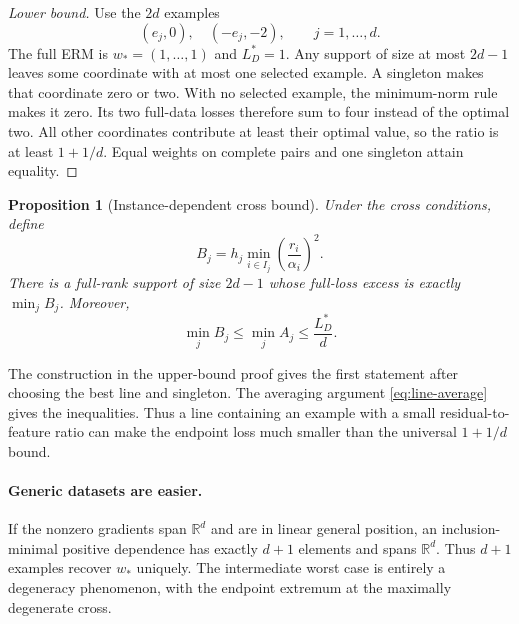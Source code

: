 \documentclass[twoside]{article}
\newtheorem{proposition}[theorem]{Proposition}
\newcommand{\R}{\mathbb R}
\begin{document}
\begin{proof}[Lower bound]
Use the $2d$ examples
\begin{equation}
 (e_j,0),\quad(-e_j,-2),\qquad j=1,\ldots,d.
 \label{eq:cross-lower}
\end{equation}
The full ERM is $w_*=(1,\ldots,1)$ and $L_D^*=1$. Any support of size at most $2d-1$ leaves some coordinate with at most one selected example. A singleton makes that coordinate zero or two. With no selected example, the minimum-norm rule makes it zero. Its two full-data losses therefore sum to four instead of the optimal two. All other coordinates contribute at least their optimal value, so the ratio is at least $1+1/d$. Equal weights on complete pairs and one singleton attain equality.
\end{proof}

\begin{proposition}[Instance-dependent cross bound]
\label{prop:instance}
Under the cross conditions, define
\begin{equation}
 B_j=h_j\min_{i\in I_j}\left(\frac{r_i}{\alpha_i}\right)^2.
 \label{eq:instance-bound}
\end{equation}
There is a full-rank support of size $2d-1$ whose full-loss excess is exactly $\min_jB_j$. Moreover,
\begin{equation}
 \min_jB_j\leq\min_jA_j\leq\frac{L_D^*}{d}.
\end{equation}
\end{proposition}

The construction in the upper-bound proof gives the first statement after choosing the best line and singleton. The averaging argument \eqref{eq:line-average} gives the inequalities. Thus a line containing an example with a small residual-to-feature ratio can make the endpoint loss much smaller than the universal $1+1/d$ bound.

\paragraph{Generic datasets are easier.}
If the nonzero gradients span $\R^d$ and are in linear general position, an inclusion-minimal positive dependence has exactly $d+1$ elements and spans $\R^d$. Thus $d+1$ examples recover $w_*$ uniquely. The intermediate worst case is entirely a degeneracy phenomenon, with the endpoint extremum at the maximally degenerate cross.
\end{document}

